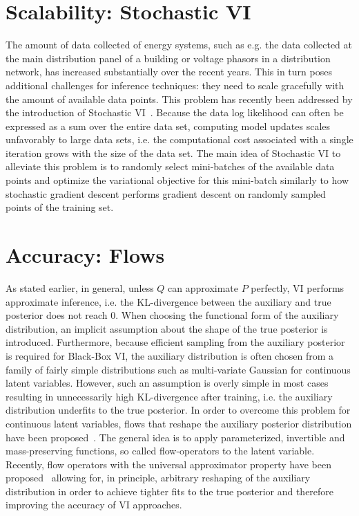\documentclass[11pt]{cmuthesis} %
\begin{document}
\section{Scalability: Stochastic VI}
The amount of data collected of energy systems, such as e.g. the data collected at the main distribution panel of a building or voltage phasors in a distribution network, has increased substantially over the recent years. This in turn poses additional challenges for inference techniques: they need to scale gracefully with the amount of available data points. This problem has recently been addressed by the introduction of Stochastic VI~\cite{mesbah2017stochastic}. Because the data log likelihood can often be expressed as a sum over the entire data set, computing model updates scales unfavorably to large data sets, i.e. the computational cost associated with a single iteration grows with the size of the data set. The main idea of Stochastic VI to alleviate this problem is to randomly select mini-batches of the available data points and optimize the variational objective for this mini-batch similarly to how stochastic gradient descent performs gradient descent on randomly sampled points of the training set.

\section{Accuracy: Flows}
As stated earlier, in general, unless $Q$ can approximate $P$ perfectly, VI performs approximate inference, i.e. the KL-divergence between the auxiliary and true posterior does not reach 0. When choosing the functional form of the auxiliary distribution, an implicit assumption about the shape of the true posterior is introduced. Furthermore, because efficient sampling from the auxiliary posterior is required for Black-Box VI, the auxiliary distribution is often chosen from a family of fairly simple distributions such as multi-variate Gaussian for continuous latent variables. However, such an assumption is overly simple in most cases resulting in unnecessarily high KL-divergence after training, i.e. the auxiliary distribution underfits to the true posterior. In order to overcome this problem for continuous latent variables, flows that reshape the auxiliary posterior distribution have been proposed~\cite{rezende2015variational}. The general idea is to apply parameterized, invertible and mass-preserving functions, so called flow-operators to the latent variable. Recently, flow operators with the universal approximator property have been proposed~\cite{huang2018neural} allowing for, in principle, arbitrary reshaping of the auxiliary distribution in order to achieve tighter fits to the true posterior and therefore improving the accuracy of VI approaches.
\end{document}
